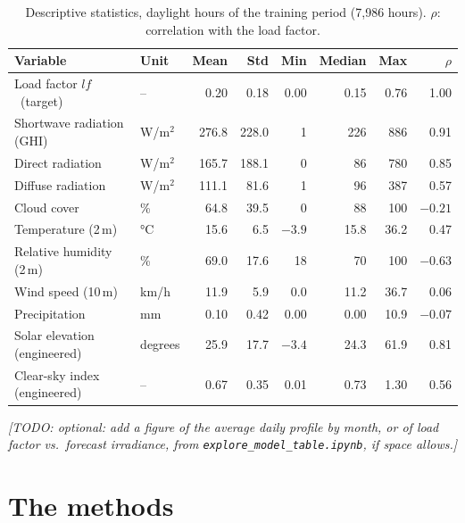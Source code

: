 \documentclass[11pt,a4paper]{article}
\newcommand{\todo}[1]{\textcolor{tbdcol!80!black}{\textit{[TODO: #1]}}}
\newcommand{\lf}{\ensuremath{\mathit{lf}}}
\begin{document}
\begin{table}[ht]
\centering\small
\caption{Descriptive statistics, daylight hours of the training period (7,986 hours). $\rho$:
correlation with the load factor.}
\label{tab:desc}
\begin{tabular}{@{}l l r r r r r r@{}}
\toprule
Variable & Unit & Mean & Std & Min & Median & Max & $\rho$ \\
\midrule
Load factor \lf\ (target)      & --         & 0.20  & 0.18  & 0.00  & 0.15  & 0.76  & 1.00 \\
Shortwave radiation (GHI)     & W/m$^2$    & 276.8 & 228.0 & 1     & 226   & 886   & 0.91 \\
Direct radiation              & W/m$^2$    & 165.7 & 188.1 & 0     & 86    & 780   & 0.85 \\
Diffuse radiation             & W/m$^2$    & 111.1 & 81.6  & 1     & 96    & 387   & 0.57 \\
Cloud cover                   & \%         & 64.8  & 39.5  & 0     & 88    & 100   & $-0.21$ \\
Temperature (2\,m)            & °C         & 15.6  & 6.5   & $-3.9$& 15.8  & 36.2  & 0.47 \\
Relative humidity (2\,m)      & \%         & 69.0  & 17.6  & 18    & 70    & 100   & $-0.63$ \\
Wind speed (10\,m)            & km/h       & 11.9  & 5.9   & 0.0   & 11.2  & 36.7  & 0.06 \\
Precipitation                 & mm         & 0.10  & 0.42  & 0.00  & 0.00  & 10.9  & $-0.07$ \\
Solar elevation (engineered)  & degrees    & 25.9  & 17.7  & $-3.4$& 24.3  & 61.9  & 0.81 \\
Clear-sky index (engineered)  & --         & 0.67  & 0.35  & 0.01  & 0.73  & 1.30  & 0.56 \\
\bottomrule
\end{tabular}
\end{table}

\todo{optional: add a figure of the average daily profile by month, or of load factor vs.\ forecast
irradiance, from \texttt{explore\_model\_table.ipynb}, if space allows.}

\section{The methods}
\label{sec:methods}
\end{document}
